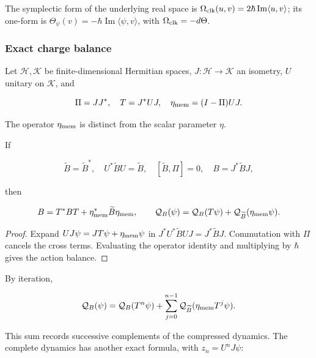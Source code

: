 The symplectic form of the underlying real space is \(\Omega_{\rm clk}(u,v)=2\hbar\operatorname{Im}\langle u,v\rangle\); its one-form is \(\Theta_\psi(v)=-\hbar\operatorname{Im}\langle\psi,v\rangle\), with \(\Omega_{\rm clk}=-d\Theta\).

\subsubsection{Exact charge balance}

Let \(\mathcal H,\mathcal K\) be finite-dimensional Hermitian spaces, \(J:\mathcal H\to\mathcal K\) an isometry, \(U\) unitary on \(\mathcal K\), and

\begin{equation}
\Pi=JJ^*,\quad T=J^*UJ,\quad
\eta_{\rm mem}=(I-\Pi)UJ.
\label{nuc07:eq:15}
\end{equation}

The operator \(\eta_{\rm mem}\) is distinct from the scalar parameter \(\eta\).

\begin{proposition}
If

\begin{equation}
\widetilde B=\widetilde B^*,\quad U^*\widetilde BU=\widetilde B,
\quad [\widetilde B,\Pi]=0,\quad B=J^*\widetilde BJ,
\label{nuc07:eq:16}
\end{equation}

then

\begin{equation}
B=T^*BT+\eta_{\rm mem}^*\widetilde B\eta_{\rm mem},
\qquad
\mathcal Q_B(\psi)=
\mathcal Q_B(T\psi)+\mathcal Q_{\widetilde B}(\eta_{\rm mem}\psi).
\label{nuc07:eq:17}
\end{equation}
\end{proposition}

\begin{proof}
Expand \(UJ\psi=JT\psi+\eta_{\rm mem}\psi\) in \(J^*U^*\widetilde BUJ=J^*\widetilde BJ\). Commutation with \(\Pi\) cancels the cross terms. Evaluating the operator identity and multiplying by \(\hbar\) gives the action balance.
\end{proof}

By iteration,

\begin{equation}
\mathcal Q_B(\psi)=\mathcal Q_B(T^n\psi)
+\sum_{j=0}^{n-1}\mathcal Q_{\widetilde B}
(\eta_{\rm mem}T^j\psi).
\label{nuc07:eq:18}
\end{equation}

This sum records successive complements of the compressed dynamics. The complete dynamics has another exact formula, with \(z_n=U^nJ\psi\):

